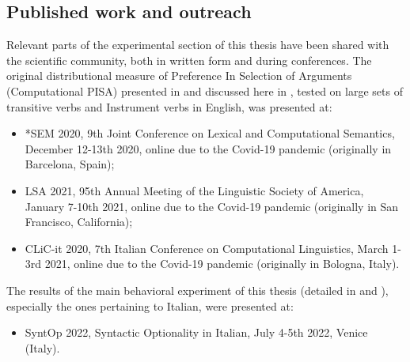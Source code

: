 \subsection{Published work and outreach}
Relevant parts of the experimental section of this thesis have been shared with the scientific community, both in written form and during conferences. The original distributional measure of Preference In Selection of Arguments (Computational PISA) presented in \textcite{CappelliLenciPISA} and discussed here in , tested on large sets of transitive verbs and Instrument verbs in English, was presented at:
\begin{itemize}
    \item *SEM 2020, 9th Joint Conference on Lexical and Computational Semantics, December 12-13th 2020, online due to the Covid-19 pandemic (originally in Barcelona, Spain);
    \item LSA 2021, 95th Annual Meeting of the Linguistic Society of America, January 7-10th 2021, online due to the Covid-19 pandemic (originally in San Francisco, California);
    \item CLiC-it 2020, 7th Italian Conference on Computational Linguistics, March 1-3rd 2021, online due to the Covid-19 pandemic (originally in Bologna, Italy).
\end{itemize}
The results of the main behavioral experiment of this thesis (detailed in  and ), especially the ones pertaining to Italian, were presented at:
\begin{itemize}
    \item SyntOp 2022, Syntactic Optionality in Italian, July 4-5th 2022, Venice (Italy).
\end{itemize}
